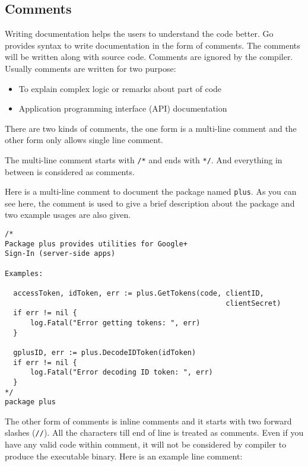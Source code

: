 \subsection{Comments}

Writing documentation helps the users to understand the code better.
Go provides syntax to write documentation in the form of
comments.  The comments will be written along with
source code.  Comments are ignored by the compiler.  Usually comments
are written for two purpose:

\begin{itemize}
  \item To explain complex logic or remarks about part of code
  \item Application programming interface (API) documentation
\end{itemize}

There are two kinds of comments, the one form is a multi-line comment
and the other form only allows single line comment.

The multi-line comment starts with \texttt{/*} and ends
with \texttt{*/}.  And everything in between is considered as
comments.

Here is a multi-line comment to document the package
named \texttt{plus}.  As you can see here, the comment is used to give
a brief description about the package and two example usages are also
given.

\begin{lstlisting}[caption=Package level comment]
/*
Package plus provides utilities for Google+
Sign-In (server-side apps)

Examples:

  accessToken, idToken, err := plus.GetTokens(code, clientID,
                                                    clientSecret)
  if err != nil {
      log.Fatal("Error getting tokens: ", err)
  }

  gplusID, err := plus.DecodeIDToken(idToken)
  if err != nil {
      log.Fatal("Error decoding ID token: ", err)
  }
*/
package plus
\end{lstlisting}

The other form of comments is inline comments and it starts with two
forward slashes (\texttt{//}).  All the characters till end of line is
treated as comments.  Even if you have any valid code within comment,
it will not be considered by compiler to produce the executable
binary.  Here is an example line comment:



